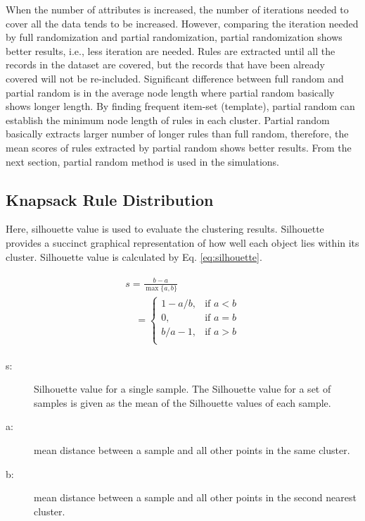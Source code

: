 \documentclass{elsart}
\begin{document}
When the number of attributes is increased, the number of iterations needed to cover all the data tends to be increased. However, comparing the iteration needed by full randomization and partial randomization, partial randomization shows better results, i.e., less iteration are needed. Rules are extracted until all the records in the dataset are covered, but the records that have been already covered will not be re-included. Significant difference between full random and partial random is in the average node length where partial random basically shows longer length. By finding frequent item-set (template), partial random can establish the minimum node length of rules in each cluster. Partial random basically extracts larger number of longer rules than full random, therefore, the mean scores of rules extracted by partial random shows better results.
From the next section, partial random method is used in the simulations.

\subsection{Knapsack Rule Distribution}
Here, silhouette value \cite{silhouette1} is used to evaluate the clustering results. Silhouette provides a succinct graphical representation of how well each object lies within its cluster. Silhouette value is calculated by Eq. \ref{eq:silhouette}.

\begin{eqnarray}
\begin{array}{lll}
s = \frac{b - a}{\max\{a,b\}} \\
\quad= \begin{cases} 1-a/b, & \mbox{if } a < b \\ 0, & \mbox{if } a = b \\ b/a-1, & \mbox{if } a > b \\ \end{cases} 
\end{array}
\label{eq:silhouette}
\end{eqnarray}
\begin{description}
\item [s:] Silhouette value for a single sample. The Silhouette value for a set of samples is given as the mean of the Silhouette values of each sample.
\item [a:] mean distance between a sample and all other points in the same cluster.
\item [b:] mean distance between a sample and all other points in the second nearest cluster.
\end{description}
\end{document}
